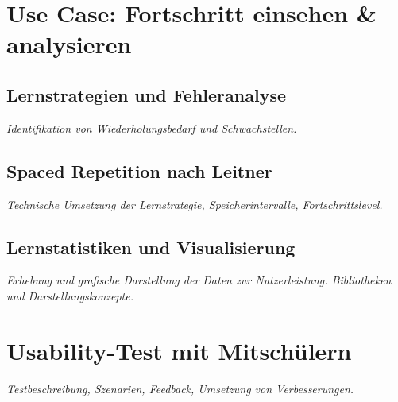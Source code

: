 \documentclass[12pt,a4paper,titlepage,listof=totoc,bibliography=totoc,chapteratlists=0pt]{scrreprt}
\begin{document}
\begin{spacing}{1}
\section{Use Case: Fortschritt einsehen \& analysieren}

\subsection{Lernstrategien und Fehleranalyse}
\setauthor{\secondauthor}
\textit{Identifikation von Wiederholungsbedarf und Schwachstellen.}

\subsection{Spaced Repetition nach Leitner}
\setauthor{\secondauthor}
\textit{Technische Umsetzung der Lernstrategie, Speicherintervalle, Fortschrittslevel.}

\subsection{Lernstatistiken und Visualisierung}
\setauthor{\secondauthor}
\textit{Erhebung und grafische Darstellung der Daten zur Nutzerleistung. Bibliotheken und Darstellungskonzepte.}

\section{Usability-Test mit Mitschülern}
\textit{Testbeschreibung, Szenarien, Feedback, Umsetzung von Verbesserungen.}

\end{spacing}



\newpage
{}
\setcounter{page}{\value{RPages}}

\glsnogroupskiptrue
{}
{
	\printglossary[title=Glossar,toctitle=Glossar]
}
{
	\printglossary[title=Glossary,toctitle=Glossary]
}
\listoffigures
\listoftables
\lstlistoflistings
\appendix
{}

\end{document}
